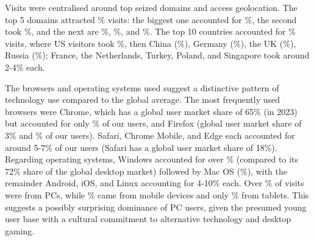 \documentclass[letterpaper,twocolumn,10pt]{article}
\begin{document}
Visits were centralised around top seized domains and access geolocation. The top 5 domains attracted \BTnGroundTruthTopDomainsProps\% visits: the biggest one accounted for \BTnGroundTruthTopDomainsipstresserxcomProps\%, the second took \BTnGroundTruthTopDomainsinstantstresserxcomProps\%, and the next are \BTnGroundTruthTopDomainsstresserxappProps\%, \BTnGroundTruthTopDomainsbootyouxnetProps\%, and \BTnGroundTruthTopDomainsfreestresserxsoProps\%. The top 10 countries accounted for \BTnGroundTruthTopCountriesProps\% visits, where US visitors took \BTnGroundTruthTopCountriesUSProps\%, then China (\BTnGroundTruthTopCountriesCNProps\%), Germany (\BTnGroundTruthTopCountriesDEProps\%), the UK (\BTnGroundTruthTopCountriesGBProps\%), Russia (\BTnGroundTruthTopCountriesRUProps\%); France, the Netherlands, Turkey, Poland, and Singapore took around 2-4\% each.

The browsers and operating systems used suggest a distinctive pattern of technology use compared to the global average. The most frequently used browsers were Chrome, which has a global user market share of 65\% (in 2023) but accounted for only \BTnGroundTruthTopBrowserChromeProps\% of our users, and Firefox (global user market share of 3\% and \BTnGroundTruthTopBrowserFirefoxProps\% of our users). Safari, Chrome Mobile, and Edge each accounted for around 5-7\% of our users (Safari has a global user market share of 18\%). Regarding operating systems, Windows accounted for over \BTnGroundTruthTopOSWindowsProps\% (compared to its 72\% share of the global desktop market) followed by Mac OS (\BTnGroundTruthTopOSMacOSXProps\%), with the remainder Android, iOS, and Linux accounting for 4-10\% each. Over \BTnGroundTruthTopDeviceTypePCProps\% of visits were from PCs, while \BTnGroundTruthTopDeviceTypeMobileProps\% came from mobile devices and only \BTnGroundTruthTopDeviceTypeTabletProps\% from tablets. This suggests a possibly surprising dominance of PC users, given the presumed young user base with a cultural commitment to alternative technology and desktop gaming.
\end{document}
